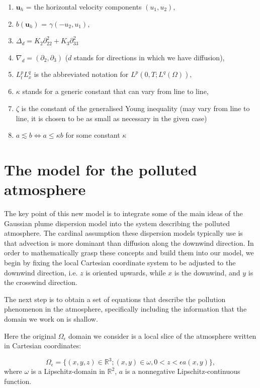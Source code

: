 \documentclass[11pt]{article}
\begin{document}
\begin{enumerate}
\item $\mathbf{u}_h$ = the horizontal velocity components $(u_1, u_2),$
\item $b(\mathbf{u}_h)$ = $\gamma ( - u_2 , u_1),$
\item $\Delta_d = K_2 \partial_{22}^2 + K_3 \partial_{33}^2$
\item $\nabla_d = (\partial_2, \partial_3)$ ($d$ stands for directions in which we have diffusion),
\item $L^p_t L^q_x$ is the abbreviated notation for $L^p (0, T; L^q(\Omega)),$
\item $\kappa$ stands for a generic constant that can vary from line to line,
\item $\zeta$ is the constant of the generalised Young inequality (may vary from line to line, it is chosen to be as small as necessary in the given case)
\item $a \lesssim b \Leftrightarrow a \leq \kappa b$ for some constant $\kappa$

\end{enumerate}

\section{The model for the polluted atmosphere} \label{eqsdescribingatmpluspollution}

The key point of this new model is to integrate some of the main ideas of the Gaussian plume dispersion model into the system describing the polluted atmosphere. The cardinal assumption these dispersion models typically use is that advection is more dominant than diffusion along the downwind direction. In order to mathematically grasp these concepts and build them into our model, we begin by fixing the local Cartesian coordinate system to be adjusted to the downwind direction, i.e. $z$ is oriented upwards, while $x$ is the downwind, and $y$ is the crosswind direction.

The next step is to obtain a set of equations that describe the pollution phenomenon in the atmosphere, specifically including the information that the domain we work on is shallow.

Here the original $\Omega_\epsilon$ domain we consider is a local slice of the atmosphere written in Cartesian coordinates:

\begin{equation}\label{original_domain_eps_including}
\Omega_{\epsilon} = \{(x,y,z) \in \mathbb{R}^3 ; (x,y) \in \omega, 0 < z < \epsilon a(x,y) \},
\end{equation}
%
where $\omega$ is a Lipschitz-domain in $\mathbb{R}^2$, $a$ is a nonnegative Lipschitz-continuous function.
\end{document}
